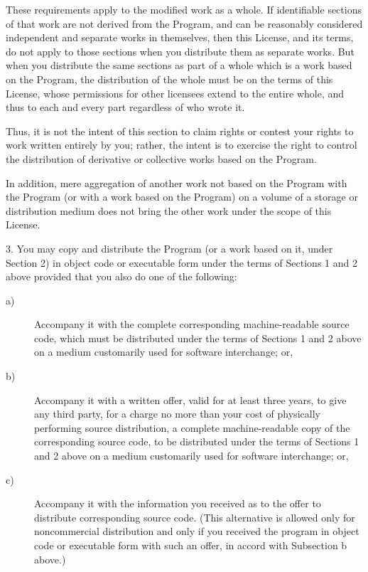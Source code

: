 These requirements apply to the modified work as a whole.  If
identifiable sections of that work are not derived from the Program,
and can be reasonably considered independent and separate works in
themselves, then this License, and its terms, do not apply to those
sections when you distribute them as separate works.  But when you
distribute the same sections as part of a whole which is a work based
on the Program, the distribution of the whole must be on the terms of
this License, whose permissions for other licensees extend to the
entire whole, and thus to each and every part regardless of who wrote it.

Thus, it is not the intent of this section to claim rights or contest
your rights to work written entirely by you; rather, the intent is to
exercise the right to control the distribution of derivative or
collective works based on the Program.

In addition, mere aggregation of another work not based on the Program
with the Program (or with a work based on the Program) on a volume of
a storage or distribution medium does not bring the other work under
the scope of this License.

  3. You may copy and distribute the Program (or a work based on it,
under Section 2) in object code or executable form under the terms of
Sections 1 and 2 above provided that you also do one of the following:

\begin{description}
\item[a)] Accompany it with the complete corresponding
  machine-readable source code, which must be distributed under the
  terms of Sections 1 and 2 above on a medium customarily used for
  software interchange; or,
\item[b)] Accompany it with a written offer, valid for at least three
  years, to give any third party, for a charge no more than your cost
  of physically performing source distribution, a complete
  machine-readable copy of the corresponding source code, to be
  distributed under the terms of Sections 1 and 2 above on a medium
  customarily used for software interchange; or,
\item[c)] Accompany it with the information you received as to the
  offer to distribute corresponding source code.  (This alternative is
  allowed only for noncommercial distribution and only if you received
  the program in object code or executable form with such an offer, in
  accord with Subsection b above.)
\end{description}

